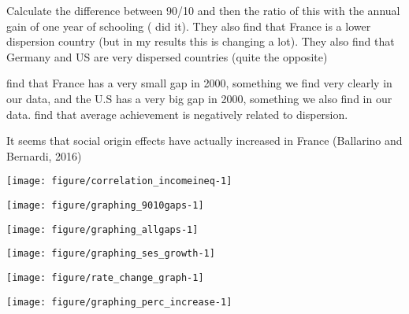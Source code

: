 \documentclass[11pt, a4paper]{article}\usepackage[]{graphicx}\usepackage[]{color}
\begin{document}
Calculate the difference between 90/10 and then the ratio of this with the annual gain of one year of schooling (\citet{micklewright} did it). They also find that France is a lower dispersion country (but in my results this is changing a lot). They also find that Germany and US are very dispersed countries (quite the opposite)

\citet{micklewright} find that France has a very small gap in 2000, something we find very clearly in our data, and the U.S has a very big gap in 2000, something we also find in our data. \citet{micklewright} find
that average achievement is negatively related to dispersion.

It seems that social origin effects have actually increased in France  (Ballarino and Bernardi, 2016)





{\centering \texttt{[image: figure/correlation\_incomeineq-1]} 

}






{\centering \texttt{[image: figure/graphing\_9010gaps-1]} 

}






{\centering \texttt{[image: figure/graphing\_allgaps-1]} 

}






{\centering \texttt{[image: figure/graphing\_ses\_growth-1]} 

}










{\centering \texttt{[image: figure/rate\_change\_graph-1]} 

}








{\centering \texttt{[image: figure/graphing\_perc\_increase-1]} 

}









\end{document}

